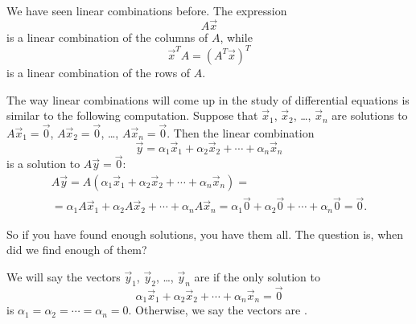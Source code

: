 We have seen linear combinations before.  The expression
\begin{equation*}
A \vec{x}
\end{equation*}
is a linear combination of the columns of $A$, while
\begin{equation*}
\vec{x}^T A = (A^T \vec{x})^T
\end{equation*}
is a linear combination of the rows of $A$.

The way linear combinations will come up in the study of differential
equations is similar to the following computation.  Suppose that
$\vec{x}_1$, $\vec{x}_2$, \ldots, $\vec{x}_n$ are solutions
to $A \vec{x}_1 = \vec{0}$, 
$A \vec{x}_2 = \vec{0}$, \ldots,
$A \vec{x}_n = \vec{0}$.
Then the linear combination
\begin{equation*}
\vec{y} = \alpha_1 \vec{x}_1 + 
\alpha_2 \vec{x}_2 + 
\cdots +
\alpha_n \vec{x}_n 
\end{equation*}
is a solution to $A \vec{y} = \vec{0}$:
\begin{multline*}
A \vec{y} =
A (\alpha_1 \vec{x}_1 + 
\alpha_2 \vec{x}_2 + 
\cdots +
\alpha_n \vec{x}_n )
=
\\
=
\alpha_1 A \vec{x}_1 + 
\alpha_2 A \vec{x}_2 + 
\cdots +
\alpha_n A \vec{x}_n
=
\alpha_1 \vec{0} + 
\alpha_2 \vec{0} + 
\cdots +
\alpha_n \vec{0} = \vec{0} .
\end{multline*}

So if you have found enough solutions, you have them all.  The question is,
when did we find enough of them?

We will say the vectors $\vec{y}_1$, $\vec{y}_2$, \ldots, $\vec{y}_n$ are
\emph{} if the only solution to
\begin{equation*}
\alpha_1 \vec{x}_1 + 
\alpha_2 \vec{x}_2 + 
\cdots +
\alpha_n \vec{x}_n 
=
\vec{0}
\end{equation*}
is $\alpha_1 = \alpha_2 = \cdots = \alpha_n = 0$.
Otherwise, we say the vectors are \emph{}.

